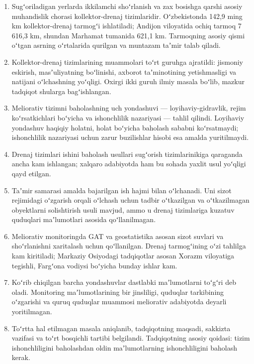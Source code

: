 \documentclass[14pt,a4paper,oneside]{extreport}
\providecommand{\tightlist}{\setlength{\itemsep}{0pt}\setlength{\parskip}{0pt}}
\begin{document}
\begin{enumerate}
\def\labelenumi{\arabic{enumi}.}
\tightlist
\item
  Sugʻoriladigan yerlarda ikkilamchi shoʻrlanish va zax bosishga qarshi
  asosiy muhandislik chorasi kollektor-drenaj tizimlaridir.
  Oʻzbekistonda 142,9 ming km kollektor-drenaj tarmogʻi ishlatiladi;
  Andijon viloyatida ochiq tarmoq 7 616,3 km, shundan Marhamat tumanida
  621,1 km. Tarmoqning asosiy qismi oʻtgan asrning oʻrtalarida qurilgan
  va muntazam taʼmir talab qiladi.
\item
  Kollektor-drenaj tizimlarining muammolari toʻrt guruhga ajratildi:
  jismoniy eskirish, masʼuliyatning boʻlinishi, axborot taʼminotining
  yetishmasligi va natijani oʻlchashning yoʻqligi. Oxirgi ikki guruh
  ilmiy masala boʻlib, mazkur tadqiqot shularga bagʻishlangan.
\item
  Meliorativ tizimni baholashning uch yondashuvi ---
  loyihaviy-gidravlik, rejim koʻrsatkichlari boʻyicha va ishonchlilik
  nazariyasi --- tahlil qilindi. Loyihaviy yondashuv haqiqiy holatni,
  holat boʻyicha baholash sababni koʻrsatmaydi; ishonchlilik nazariyasi
  uchun zarur buzilishlar hisobi esa amalda yuritilmaydi.
\item
  Drenaj tizimlari ishini baholash usullari sugʻorish tizimlarinikiga
  qaraganda ancha kam ishlangan; xalqaro adabiyotda ham bu sohada yaxlit
  usul yoʻqligi qayd etilgan.
\item
  Taʼmir samarasi amalda bajarilgan ish hajmi bilan oʻlchanadi. Uni
  sizot rejimidagi oʻzgarish orqali oʻlchash uchun tadbir oʻtkazilgan va
  oʻtkazilmagan obyektlarni solishtirish usuli mavjud, ammo u drenaj
  tizimlariga kuzatuv quduqlari maʼlumotlari asosida qoʻllanilmagan.
\item
  Meliorativ monitoringda GAT va geostatistika asosan sizot suvlari va
  shoʻrlanishni xaritalash uchun qoʻllanilgan. Drenaj tarmogʻining oʻzi
  tahlilga kam kiritiladi; Markaziy Osiyodagi tadqiqotlar asosan Xorazm
  viloyatiga tegishli, Fargʻona vodiysi boʻyicha bunday ishlar kam.
\item
  Koʻrib chiqilgan barcha yondashuvlar dastlabki maʼlumotlarni toʻgʻri
  deb oladi. Monitoring maʼlumotlarining bir jinsliligi, quduqlar
  tarkibining oʻzgarishi va quruq quduqlar muammosi meliorativ
  adabiyotda deyarli yoritilmagan.
\item
  Toʻrtta hal etilmagan masala aniqlanib, tadqiqotning maqsadi, sakkizta
  vazifasi va toʻrt bosqichli tartibi belgilandi. Tadqiqotning asosiy
  qoidasi: tizim ishonchliligini baholashdan oldin maʼlumotlarning
  ishonchliligini baholash kerak.
\end{enumerate}
\end{document}
